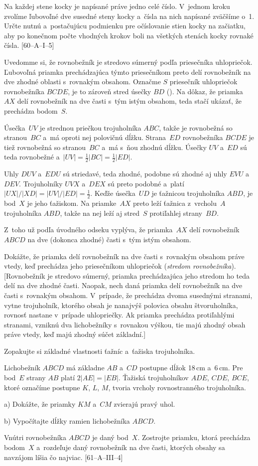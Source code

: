 {\D
Na každej stene kocky je napísané práve jedno celé číslo. V~jednom kroku zvolíme
ľubovoľné dve susedné steny kocky a~čísla na nich napísané zväčšíme o~1. Určte
nutnú
a~postačujúcu podmienku pre očíslovanie stien kocky na začiatku, aby po konečnom
počte vhodných krokov boli na všetkých stenách kocky rovnaké čísla. [60--A--I--5]
}

{%
Uvedomme si, že rovnobežník je stredovo súmerný podľa priesečníka uhlopriečok. Ľubovoľná
priamka prechádzajúca týmto priesečníkom preto delí rovnobežník na dve zhodné oblasti
s~rovnakým obsahom. Označme $S$ priesečník uhlopriečok rovnobežníka $BCDE$, je to
zároveň stred úsečky $BD$ (\obr).
%
Na dôkaz, že priamka~$AX$ delí rovnobežník na dve časti
s~tým istým obsahom, teda stačí ukázať, že prechádza bodom~$S$.

Úsečka~$UV$ je strednou priečkou trojuholníka $ABC$, takže je rovnobežná so stranou~$BC$ a~má
oproti nej polovičnú dĺžku. Strana~$ED$ rovnobežníka $BCDE$ je tiež rovnobežná so stranou~$BC$
a~má s~ňou zhodnú dĺžku. Úsečky $UV$ a~$ED$ sú teda rovnobežné a~$|UV|=\frac12|BC|=\frac12|ED|$.

Uhly $DUV$ a~$EDU$ sú striedavé, teda zhodné, podobne sú zhodné aj uhly $EVU$
a~$DEV$. Trojuholníky $UVX$ a~$DEX$ sú preto podobné
a~platí $|UX|/|XD|=|UV|/|ED|=\frac12$. Keďže
úsečka~$UD$ je ťažnicou trojuholníka $ABD$, je bod~$X$ je jeho ťažiskom.
Na priamke~$AX$ preto leží ťažnica z~vrcholu~$A$ trojuholníka $ABD$, takže na nej leží
aj stred~$S$ protiľahlej strany~$BD$.

Z~toho už podľa úvodného odseku vyplýva, že priamka~$AX$ delí rovnobežník $ABCD$
na dve (dokonca zhodné) časti s~tým istým obsahom.



Dokážte, že priamka delí rovnobežník na dve časti s~rovnakým obsahom práve vtedy, keď prechádza
jeho priesečníkom uhlopriečok ({\it stredom rovnobežníka\/}). [Rovnobežník je stredovo
súmerný, priamka prechádzajúca jeho stredom ho teda delí na dve zhodné časti. Naopak,
nech daná priamka delí rovnobežník na dve časti s~rovnakým obsahom. V~prípade, že
prechádza dvoma susednými stranami, vytne trojuholník, ktorého obsah je nanajvýš polovica
obsahu štvoruholníka, rovnosť nastane v~prípade uhlopriečky. Ak priamka prechádza
protiľahlými stranami, vzniknú dva lichobežníky s~rovnakou výškou, tie majú zhodný
obsah práve vtedy, keď majú zhodný súčet základní.]

Zopakujte si základné vlastnosti ťažníc a~ťažiska trojuholníka.

\D
Lichobežník $ABCD$ má základne $AB$ a~$CD$ postupne dĺžok 18\,cm a~6\,cm. Pre bod~$E$
strany $AB$ platí $2|AE| = |EB|$. Ťažiská trojuholníkov $ADE$, $CDE$, $BCE$, ktoré
označíme
postupne $K$, $L$, $M$, tvoria vrcholy rovnostranného trojuholníka.
\item{a)} Dokážte, že priamky $KM$ a~$CM$ zvierajú pravý uhol.
\item{b)} Vypočítajte dĺžky ramien lichobežníka $ABCD$.
\endgraf
[60--C--II--3]

Vnútri rovnobežníka $ABCD$ je daný bod~$X$. Zostrojte priamku, ktorá prechádza
bodom~$X$ a~rozdeľuje daný rovnobežník na dve časti, ktorých obsahy sa navzájom líšia
čo najviac.
[61--A--III--4]
}

